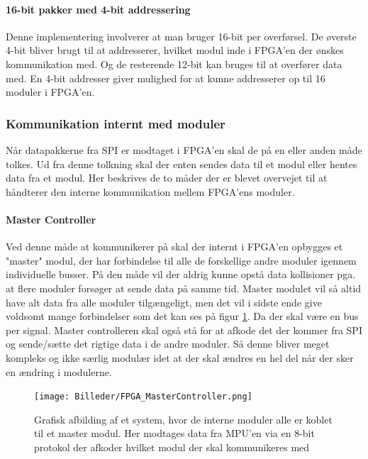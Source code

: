 \paragraph*{16-bit pakker med 4-bit addressering}
Denne implementering involverer at man bruger 16-bit per overførsel. De øverste 4-bit bliver brugt til at addresserer, hvilket modul inde i FPGA'en der ønskes kommunikation med. Og de resterende 12-bit kan bruges til at overfører data med. En 4-bit addresser giver mulighed for at kunne addresserer op til 16 moduler i FPGA'en.

\subsubsection{Kommunikation internt med moduler}
Når datapakkerne fra SPI er modtaget i FPGA'en skal de på en eller anden måde tolkes. Ud fra denne tolkning skal der enten sendes data til et modul eller hentes data fra et modul. Her beskrives de to måder der er blevet overvejet til at håndterer den interne kommunikation mellem FPGA'ens moduler.

\paragraph*{Master Controller}
Ved denne måde at kommunikerer på skal der internt i FPGA'en opbygges et "master" modul, der har forbindelse til alle de forskellige andre moduler igennem individuelle busser. På den måde vil der aldrig kunne opstå data kollisioner pga. at flere moduler forsøger at sende data på samme tid. Master modulet vil så altid have alt data fra alle moduler tilgængeligt, men det vil i sidste ende give voldsomt mange forbindelser som det kan ses på figur \ref{fig:FPGA_MasterController}. Da der skal være en bus per signal. Master controlleren skal også stå for at afkode det der kommer fra SPI og sende/sætte det rigtige data i de andre moduler. Så denne bliver meget kompleks og ikke særlig modulær idet at der skal ændres en hel del når der sker en ændring i modulerne.

\begin{figure}[ht]
	\begin{center}
		\texttt{[image: Billeder/FPGA\_MasterController.png]}
	\end{center}
\caption{Grafisk afbilding af et system, hvor de interne moduler alle er koblet til et master modul. Her modtages data fra MPU'en via en 8-bit protokol der afkoder hvilket modul der skal kommunikeres med}
\label{fig:FPGA_MasterController}
\end{figure}

